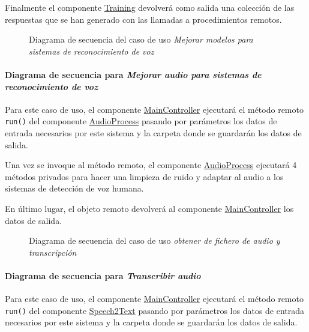 \documentclass[../main.tex]{subfiles}
\begin{document}
Finalmente el componente \hyperref[par:training]{Training} devolverá como salida una colección de las respuestas que se han generado con las llamadas a procedimientos remotos.

\begin{figure}[H]
    \centering
    
    \caption{Diagrama de secuencia del caso de uso \textit{Mejorar modelos para sistemas de reconocimiento de voz}}
    \label{fig:flow_training}
\end{figure}


\paragraph{Diagrama de secuencia para \textit{Mejorar audio para sistemas de reconocimiento de voz}}

Para este caso de uso, el componente \hyperref[par:maincontroller]{MainController} ejecutará el método remoto \verb+run()+ del componente  \hyperref[par:audioprocess]{AudioProcess} pasando por parámetros los datos de entrada necesarios por este sistema y la carpeta donde se guardarán los datos de salida.

Una vez se invoque al método remoto, el componente \hyperref[par:audioprocess]{AudioProcess} ejecutará 4 métodos privados para hacer una limpieza de ruido y adaptar al audio a los sistemas de detección de voz humana.

En último lugar, el objeto remoto devolverá al componente \hyperref[par:maincontroller]{MainController} los datos de salida.

\begin{figure}[H]
    \centering
    
    \caption{Diagrama de secuencia del caso de uso \textit{obtener de fichero de audio y transcripción}}
    \label{fig:flow_audioprocess}
\end{figure}

\paragraph{Diagrama de secuencia para \textit{Transcribir audio}}

Para este caso de uso, el componente \hyperref[par:maincontroller]{MainController} ejecutará el método remoto \verb+run()+ del componente  \hyperref[par:speech2text]{Speech2Text} pasando por parámetros los datos de entrada necesarios por este sistema y la carpeta donde se guardarán los datos de salida.
\end{document}
